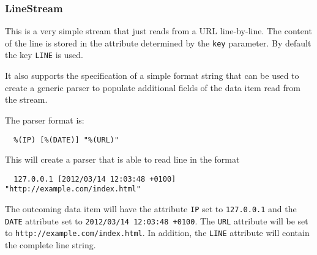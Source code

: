 \subsubsection{LineStream}

This is a very simple stream that just reads from a URL line-by-line.
The content of the line is stored in the attribute determined by the
\texttt{key} parameter. By default the key \texttt{LINE} is used.

It also supports the specification of a simple format string that can be
used to create a generic parser to populate additional fields of the
data item read from the stream.

The parser format is:

\begin{verbatim}
  %(IP) [%(DATE)] "%(URL)"
\end{verbatim}
This will create a parser that is able to read line in the format

\begin{verbatim}
  127.0.0.1 [2012/03/14 12:03:48 +0100] "http://example.com/index.html"
\end{verbatim}
The outcoming data item will have the attribute \texttt{IP} set to
\texttt{127.0.0.1} and the \texttt{DATE} attribute set to
\texttt{2012/03/14 12:03:48 +0100}. The \texttt{URL} attribute will be
set to \texttt{http://example.com/index.html}. In addition, the
\texttt{LINE} attribute will contain the complete line string.

\begin{figure}[h]
\end{figure}

